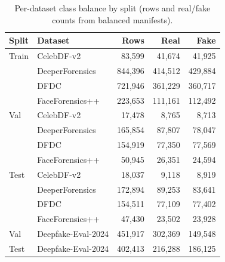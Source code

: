 \begin{table}[htbp]
  \centering
  \caption{Per-dataset class balance by split (rows and real/fake counts from balanced manifests).}
  \label{tab:dataset_balance}
  {\small
  \begin{tabular}{llrrr}
    \toprule
    Split & Dataset & Rows & Real & Fake \\
    \midrule
    Train & CelebDF-v2 & 83{,}599 & 41{,}674 & 41{,}925 \\
          & DeeperForensics & 844{,}396 & 414{,}512 & 429{,}884 \\
          & DFDC & 721{,}946 & 361{,}229 & 360{,}717 \\
          & FaceForensics++ & 223{,}653 & 111{,}161 & 112{,}492 \\
    Val   & CelebDF-v2 & 17{,}478 & 8{,}765 & 8{,}713 \\
          & DeeperForensics & 165{,}854 & 87{,}807 & 78{,}047 \\
          & DFDC & 154{,}919 & 77{,}350 & 77{,}569 \\
          & FaceForensics++ & 50{,}945 & 26{,}351 & 24{,}594 \\
    Test  & CelebDF-v2 & 18{,}037 & 9{,}118 & 8{,}919 \\
          & DeeperForensics & 172{,}894 & 89{,}253 & 83{,}641 \\
          & DFDC & 154{,}511 & 77{,}109 & 77{,}402 \\
          & FaceForensics++ & 47{,}430 & 23{,}502 & 23{,}928 \\
    \midrule
    Val   & Deepfake-Eval-2024 & 451{,}917 & 302{,}369 & 149{,}548 \\
    Test  & Deepfake-Eval-2024 & 402{,}413 & 216{,}288 & 186{,}125 \\
    \bottomrule
  \end{tabular}}
\end{table}
\FloatBarrier

